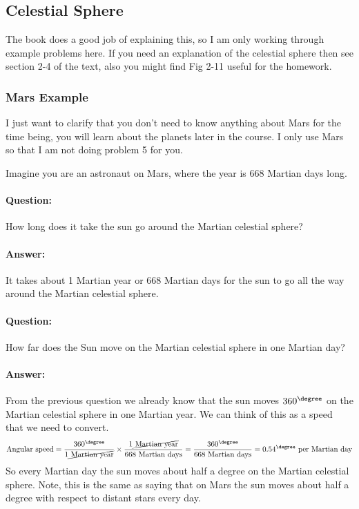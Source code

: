 \subsection*{Celestial Sphere}
The book does a good job of explaining this, so I am only working through example problems here. If you need an explanation of the celestial sphere then see section 2-4 of the text, also you might find Fig 2-11 useful for the homework. 

\subsubsection*{Mars Example}
{ \footnotesize *I just want to clarify that you don't need to know anything about Mars for the time being, you will learn about the planets later in the course. I only use Mars so that I am not doing problem 5 for you.}
\vspace{12 pt}

\noindent Imagine you are an astronaut on Mars, where the year is 668 Martian days long.
\paragraph*{Question:} How long does it take the sun go around the Martian celestial sphere?
\paragraph*{Answer:} It takes about 1 Martian year or 668 Martian days for the sun to go all the way around the 
Martian celestial sphere.
\paragraph*{Question:} How far does the Sun move on the Martian celestial sphere in one Martian day? 
\paragraph*{Answer:} From the previous question we already know that the sun moves $360^\degree$ on the Martian celestial sphere in one Martian year. We can think of this as a speed that we need to convert.
$$ \text{Angular speed}=\dfrac{360^\degree}{1 \cancel{\text{ Martian year}}}\times \dfrac{1 \cancel{\text{ Martian year}}}{668 \text{ Martian days}}=\dfrac{360^\degree}{668 \text{ Martian days}}=0.54^\degree \text{ per Martian day}$$
So every Martian day the sun moves about half a degree on the Martian celestial sphere. Note, this is the same as saying that on Mars the sun moves about half a degree with respect to distant stars every day.

